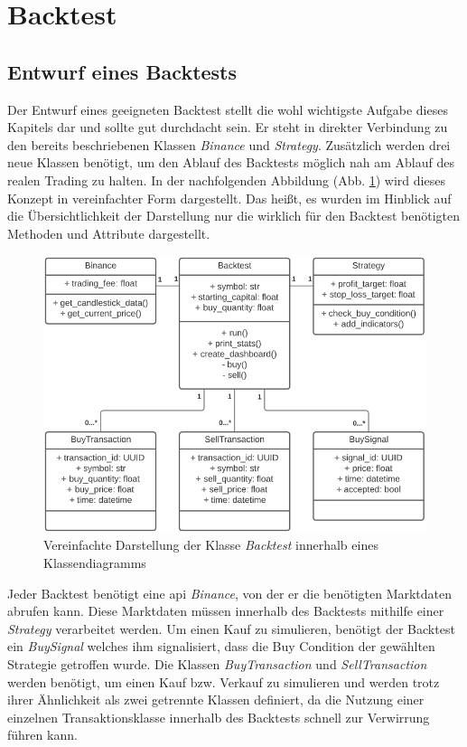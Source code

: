 \documentclass[oneside]{ausarbeitung}
\begin{document}

\section{Backtest}
\label{sec:backtest}

\subsection{Entwurf eines Backtests}
\label{sub:entwurf_eines_backtests}

Der Entwurf eines geeigneten Backtest stellt die wohl wichtigste Aufgabe dieses Kapitels dar und sollte gut durchdacht sein. Er steht in direkter Verbindung zu den bereits beschriebenen Klassen \textit{Binance} und \textit{Strategy}. Zusätzlich werden drei neue Klassen benötigt, um den Ablauf des Backtests möglich nah am Ablauf des realen Trading zu halten. In der nachfolgenden Abbildung (Abb. \ref{fig:12}) wird dieses Konzept in vereinfachter Form dargestellt. Das heißt, es wurden im Hinblick auf die Übersichtlichkeit der Darstellung nur die wirklich für den Backtest benötigten Methoden und Attribute dargestellt.

\begin{figure}[H]
  \centering
  \includegraphics[height=0.48\textheight]{uml/backtest_uml.png}
  \caption{Vereinfachte Darstellung der Klasse \textit{Backtest} innerhalb eines 		Klassendiagramms}
  \label{fig:12}
\end{figure}

Jeder Backtest benötigt eine \ac{api} \textit{Binance}, von der er die benötigten Marktdaten abrufen kann. Diese Marktdaten müssen innerhalb des Backtests mithilfe
einer \textit{Strategy} verarbeitet werden. Um einen Kauf zu simulieren, benötigt der Backtest ein \textit{BuySignal} welches ihm signalisiert, dass die Buy Condition der gewählten Strategie getroffen wurde. Die Klassen \textit{BuyTransaction} und \textit{SellTransaction} werden benötigt, um einen Kauf bzw. Verkauf zu simulieren und werden trotz ihrer Ähnlichkeit als zwei getrennte Klassen definiert, da die Nutzung einer einzelnen Transaktionsklasse innerhalb des Backtests schnell zur Verwirrung führen kann.
\end{document}
